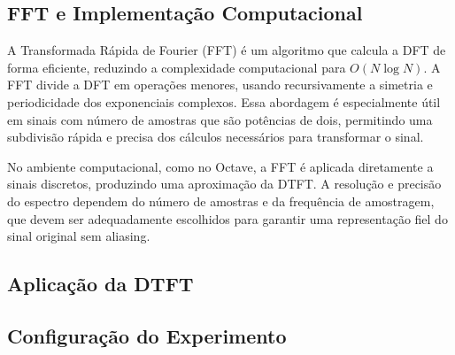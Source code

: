 \subsection{FFT e Implementação Computacional}

A Transformada Rápida de Fourier (FFT) é um algoritmo que calcula a DFT de forma eficiente, reduzindo a complexidade computacional para \( O(N \log N) \). A FFT divide a DFT em operações menores, usando recursivamente a simetria e periodicidade dos exponenciais complexos. Essa abordagem é especialmente útil em sinais com número de amostras que são potências de dois, permitindo uma subdivisão rápida e precisa dos cálculos necessários para transformar o sinal.

No ambiente computacional, como no Octave, a FFT é aplicada diretamente a sinais discretos, produzindo uma aproximação da DTFT. A resolução e precisão do espectro dependem do número de amostras e da frequência de amostragem, que devem ser adequadamente escolhidos para garantir uma representação fiel do sinal original sem aliasing.


\subsection{Aplicação da DTFT}


\subsection{Configuração do Experimento}


